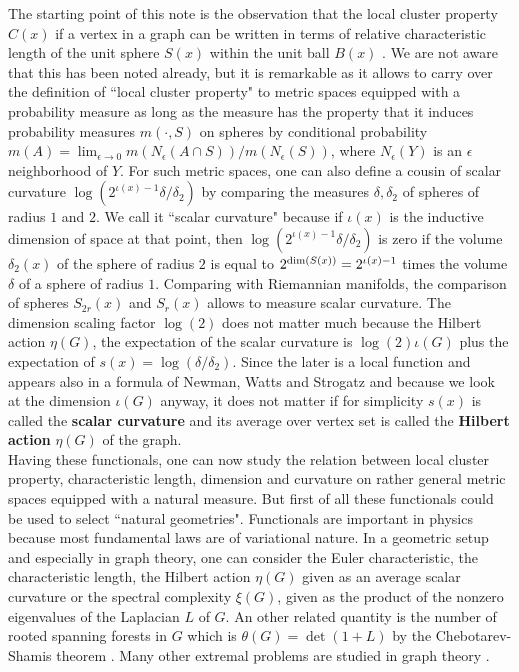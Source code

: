 \documentclass[12pt]{amsart}
\theoremstyle{definition}
\begin{document}
The starting point of this note is the observation that the local cluster property $C(x)$ if a vertex
in a graph can be written in terms of relative characteristic length of the unit sphere $S(x)$ within the 
unit ball $B(x)$ . We are not aware that this has been noted already, but it is remarkable as it allows 
to carry over the definition of ``local cluster property" to metric spaces equipped with a probability measure 
as long as the measure has the property that it induces probability measures $m(\cdot,S)$ on spheres by 
conditional probability $m(A) = \lim_{\epsilon \to 0} m(N_{\epsilon}(A \cap S))/m(N_{\epsilon}(S))$, where
$N_{\epsilon}(Y)$ is an $\epsilon$ neighborhood of $Y$. For such metric spaces, one can also define a
cousin of scalar curvature $\log(2^{\iota(x)-1} \delta/\delta_2)$ by comparing the measures $\delta,\delta_2$ 
of spheres of radius $1$ and $2$. We call it 
``scalar curvature" because if $\iota(x)$ is the inductive dimension of space at that point, then 
$\log(2^{\iota(x)-1} \delta/\delta_2)$ is zero if the volume $\delta_2(x)$ of the 
sphere of radius $2$ is equal to $2^{{\rm dim}(S(x))}= 2^{\iota(x)-1}$ times the volume $\delta$ 
of a sphere of radius $1$. Comparing with Riemannian manifolds, the comparison of spheres $S_{2r}(x)$
and $S_{r}(x)$ allows to measure scalar curvature.  The dimension scaling factor $\log(2)$ does not matter 
much because the Hilbert action $\eta(G)$, the expectation of the scalar 
curvature is $\log(2) \iota(G)$ plus the expectation of $s(x)=\log(\delta/\delta_2)$. Since the later is a local
function and appears also in a formula of Newman, Watts and Strogatz and because we look at the 
dimension $\iota(G)$ anyway, it does not matter if for simplicity $s(x)$ is called the
{\bf scalar curvature} and its average over vertex set is called the {\bf Hilbert action} $\eta(G)$
of the graph.  \\

Having these functionals, one can now study the relation between
local cluster property, characteristic length, dimension and curvature on rather general metric spaces
equipped with a natural measure. But first of all these functionals could be used to select ``natural
geometries".  Functionals are important in physics because most fundamental laws are of variational nature. 
In a geometric setup and especially in graph theory, one can consider the Euler characteristic, 
the characteristic length, the Hilbert action $\eta(G)$ given as an average scalar curvature or 
the spectral complexity $\xi(G)$, given as the product of the nonzero eigenvalues of the Laplacian $L$ 
of $G$. An other related quantity is the number of rooted spanning forests in $G$ which is 
$\theta(G) = \det(1+L)$ by the Chebotarev-Shamis theorem
\cite{ChebotarevShamis2,ChebotarevShamis1,Knillforest,CauchyBinetKnill}.
Many other extremal problems are studied in graph theory \cite{BollobasExtremal}. \\
\end{document}
